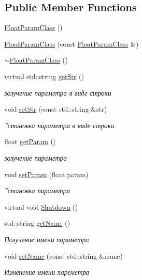 \subsection*{Public Member Functions}
\begin{DoxyCompactItemize}
\item 
\hyperlink{class_float_param_class_af9b305187fda86a00e3aa67706f7d868}{Float\+Param\+Class} ()
\item 
\hyperlink{class_float_param_class_a2d0f54420bf8b365d9785af443f8137c}{Float\+Param\+Class} (const \hyperlink{class_float_param_class}{Float\+Param\+Class} \&)
\item 
\hyperlink{class_float_param_class_ad4b3b96a2936f24e4a366313b619d539}{$\sim$\+Float\+Param\+Class} ()
\item 
virtual std\+::string \hyperlink{class_float_param_class_abe97aa2885386ef60127abe9ca0df8a4}{get\+Str} ()
\begin{DoxyCompactList}\small\item\em ѕолучение параметра в виде строки \end{DoxyCompactList}\item 
void \hyperlink{class_float_param_class_aa0068fb947c0c97301327bf2dd33392e}{set\+Str} (const std\+::string \&str)
\begin{DoxyCompactList}\small\item\em ”становка параметра в виде строки \end{DoxyCompactList}\item 
float \hyperlink{class_float_param_class_ac2802942074ac215b14ade0955f7c2df}{get\+Param} ()
\begin{DoxyCompactList}\small\item\em ѕолучение параметра \end{DoxyCompactList}\item 
void \hyperlink{class_float_param_class_a1aa06fb1d73b5272a06c7d4214735a6a}{set\+Param} (float param)
\begin{DoxyCompactList}\small\item\em ”становка параметра \end{DoxyCompactList}\item 
virtual void \hyperlink{class_set_param_class_afdb63374ca8c32f6678ba34e050e9071}{Shutdown} ()
\item 
std\+::string \hyperlink{class_set_param_class_a6c14fce9f4a896f6470888f3cacfb025}{get\+Name} ()
\begin{DoxyCompactList}\small\item\em Получение имени параметра \end{DoxyCompactList}\item 
void \hyperlink{class_set_param_class_aeabf85ad5a078ab4abb8f09a67f2c8e0}{set\+Name} (const std\+::string \&name)
\begin{DoxyCompactList}\small\item\em Изменение имени пареметра \end{DoxyCompactList}\end{DoxyCompactItemize}
